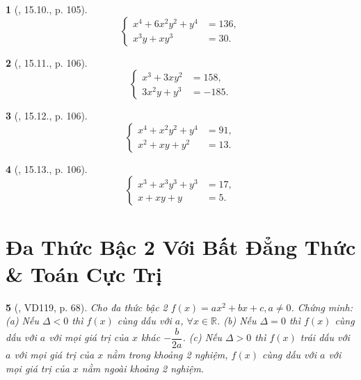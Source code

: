 \documentclass{article}
\newtheorem{baitoan}{}
\begin{document}
\begin{baitoan}[\cite{TLCT_THCS_Toan_9_dai_so}, 15.10., p. 105]
	\begin{equation*}
		\left\{\begin{split}
			x^4 + 6x^2y^2 + y^4 &= 136,\\
			x^3y + xy^3 &= 30.
		\end{split}\right.
	\end{equation*}
\end{baitoan}

\begin{baitoan}[\cite{TLCT_THCS_Toan_9_dai_so}, 15.11., p. 106]
	\begin{equation*}
		\left\{\begin{split}
			x^3 + 3xy^2 &= 158,\\
			3x^2y + y^3 &= -185.
		\end{split}\right.
	\end{equation*}
\end{baitoan}

\begin{baitoan}[\cite{TLCT_THCS_Toan_9_dai_so}, 15.12., p. 106]
	\begin{equation*}
		\left\{\begin{split}
			x^4 + x^2y^2 + y^4 &= 91,\\
			x^2 + xy + y^2 &= 13.
		\end{split}\right.
	\end{equation*}
\end{baitoan}

\begin{baitoan}[\cite{TLCT_THCS_Toan_9_dai_so}, 15.13., p. 106]
	\begin{equation*}
		\left\{\begin{split}
			x^3 + x^3y^3 + y^3 &= 17,\\
			x + xy + y &= 5.
		\end{split}\right.
	\end{equation*}
\end{baitoan}


\section{Đa Thức Bậc 2 Với Bất Đẳng Thức \& Toán Cực Trị}

\begin{baitoan}[\cite{Binh_Toan_9_tap_2}, VD119, p. 68]
	Cho đa thức bậc 2 $f(x) = ax^2 + bx + c,a\ne0$. Chứng minh: (a) Nếu $\Delta < 0$ thì $f(x)$ cùng dấu với $a$, $\forall x\in\mathbb{R}$. (b) Nếu $\Delta = 0$ thì $f(x)$ cùng dấu với $a$ với mọi giá trị của $x$ khác $-\dfrac{b}{2a}$. (c) Nếu $\Delta > 0$ thì $f(x)$ trái dấu với $a$ với mọi giá trị của $x$ nằm trong khoảng 2 nghiệm, $f(x)$ cùng dấu với $a$ với mọi giá trị của $x$ nằm ngoài khoảng 2 nghiệm.
\end{baitoan}
\end{document}

